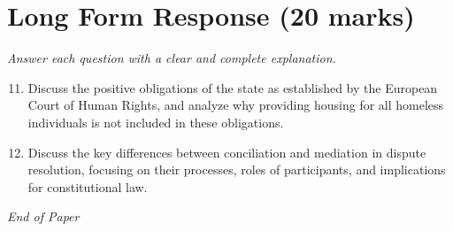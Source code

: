 \documentclass[12pt]{article}
\begin{document}
\section*{Long Form Response (20 marks)}
\textit{Answer each question with a clear and complete explanation.}
\begin{enumerate}[label=\arabic*.]
\setcounter{enumi}{10}
\item Discuss the positive obligations of the state as established by the European Court of Human Rights, and analyze why providing housing for all homeless individuals is not included in these obligations.
\item Discuss the key differences between conciliation and mediation in dispute resolution, focusing on their processes, roles of participants, and implications for constitutional law.
\end{enumerate}

\vfill
\noindent\textit{End of Paper}
\end{document}
